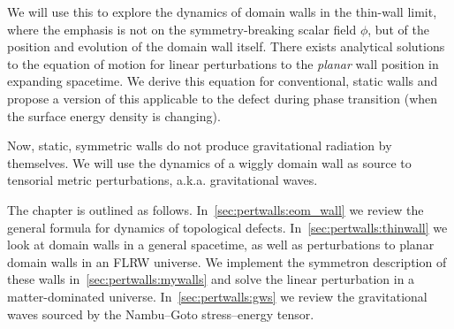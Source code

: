 
We will use this to explore the dynamics of domain walls in the thin-wall limit, where the emphasis is not on the symmetry-breaking scalar field $\phi$, but of the position and evolution of the domain wall itself. There exists analytical solutions to the equation of motion for linear perturbations to the \emph{planar} wall position in expanding spacetime. We derive this equation for conventional, static walls and propose a version of this applicable to the defect during phase transition (when the surface energy density is changing). 

Now, static, symmetric walls do not produce gravitational radiation by themselves. We will use the dynamics of a wiggly domain wall as source to tensorial metric perturbations, a.k.a. gravitational waves.








The chapter is outlined as follows. In~\cref{sec:pertwalls:eom_wall} we review the general formula for dynamics of topological defects. In~\cref{sec:pertwalls:thinwall} we look at domain walls in a general spacetime, as well as perturbations to planar domain walls in an FLRW universe. We implement the symmetron description of these walls in~\cref{sec:pertwalls:mywalls} and solve the linear perturbation in a matter-dominated universe. In~\cref{sec:pertwalls:gws} we review the gravitational waves sourced by the Nambu--Goto stress--energy tensor.













